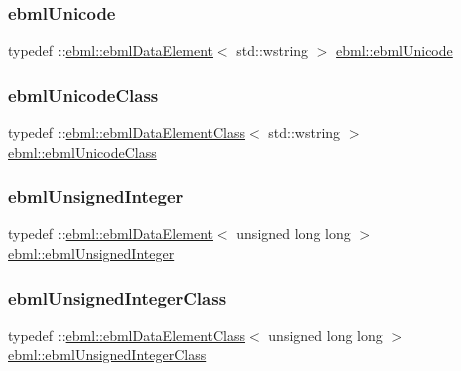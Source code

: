 \subsubsection{\texorpdfstring{ebml\+Unicode}{ebmlUnicode}}
{\footnotesize\ttfamily typedef \+::\mbox{\hyperlink{classebml_1_1ebmlDataElement}{ebml\+::ebml\+Data\+Element}}$<$ std\+::wstring $>$ \mbox{\hyperlink{namespaceebml_abd9662588801df32dd1d2853a9f2f9b1}{ebml\+::ebml\+Unicode}}}

\mbox{\label{namespaceebml_acdb74e752b77d5b4a4c445684db86832}} 
\subsubsection{\texorpdfstring{ebml\+Unicode\+Class}{ebmlUnicodeClass}}
{\footnotesize\ttfamily typedef \+::\mbox{\hyperlink{classebml_1_1ebmlDataElementClass}{ebml\+::ebml\+Data\+Element\+Class}}$<$ std\+::wstring $>$ \mbox{\hyperlink{namespaceebml_acdb74e752b77d5b4a4c445684db86832}{ebml\+::ebml\+Unicode\+Class}}}

\mbox{\label{namespaceebml_a094d15ef60da5dd0e74a4e379ac3e547}} 
\subsubsection{\texorpdfstring{ebml\+Unsigned\+Integer}{ebmlUnsignedInteger}}
{\footnotesize\ttfamily typedef \+::\mbox{\hyperlink{classebml_1_1ebmlDataElement}{ebml\+::ebml\+Data\+Element}}$<$ unsigned long long $>$ \mbox{\hyperlink{namespaceebml_a094d15ef60da5dd0e74a4e379ac3e547}{ebml\+::ebml\+Unsigned\+Integer}}}

\mbox{\label{namespaceebml_a506b246c5594e5d0322c3c05e9820fd2}} 
\subsubsection{\texorpdfstring{ebml\+Unsigned\+Integer\+Class}{ebmlUnsignedIntegerClass}}
{\footnotesize\ttfamily typedef \+::\mbox{\hyperlink{classebml_1_1ebmlDataElementClass}{ebml\+::ebml\+Data\+Element\+Class}}$<$ unsigned long long $>$ \mbox{\hyperlink{namespaceebml_a506b246c5594e5d0322c3c05e9820fd2}{ebml\+::ebml\+Unsigned\+Integer\+Class}}}

